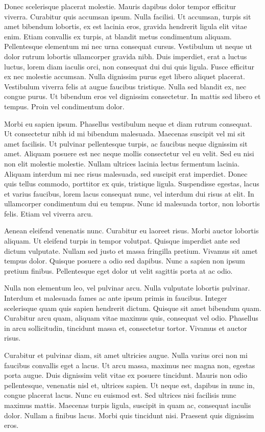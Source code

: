\documentclass[12pt,a4paper]{article}
\begin{document}
Donec scelerisque placerat molestie. Mauris dapibus dolor tempor efficitur viverra. Curabitur quis accumsan ipsum. Nulla facilisi. Ut accumsan, turpis sit amet bibendum lobortis, ex est lacinia eros, gravida hendrerit ligula elit vitae enim. Etiam convallis ex turpis, at blandit metus condimentum aliquam. Pellentesque elementum mi nec urna consequat cursus. Vestibulum ut neque ut dolor rutrum lobortis ullamcorper gravida nibh. Duis imperdiet, erat a luctus luctus, lorem diam iaculis orci, non consequat dui dui quis ligula. Fusce efficitur ex nec molestie accumsan. Nulla dignissim purus eget libero aliquet placerat. Vestibulum viverra felis at augue faucibus tristique. Nulla sed blandit ex, nec congue purus. Ut bibendum eros vel dignissim consectetur. In mattis sed libero et tempus. Proin vel condimentum dolor.

Morbi eu sapien ipsum. Phasellus vestibulum neque et diam rutrum consequat. Ut consectetur nibh id mi bibendum malesuada. Maecenas suscipit vel mi sit amet facilisis. Ut pulvinar pellentesque turpis, ac faucibus neque dignissim sit amet. Aliquam posuere est nec neque mollis consectetur vel eu velit. Sed eu nisi non elit molestie molestie. Nullam ultrices lacinia lectus fermentum lacinia. Aliquam interdum mi nec risus malesuada, sed suscipit erat imperdiet. Donec quis tellus commodo, porttitor ex quis, tristique ligula. Suspendisse egestas, lacus et varius faucibus, lorem lacus consequat nunc, vel interdum dui risus at elit. In ullamcorper condimentum dui eu tempus. Nunc id malesuada tortor, non lobortis felis. Etiam vel viverra arcu.

Aenean eleifend venenatis nunc. Curabitur eu laoreet risus. Morbi auctor lobortis aliquam. Ut eleifend turpis in tempor volutpat. Quisque imperdiet ante sed dictum vulputate. Nullam sed justo et massa fringilla pretium. Vivamus sit amet tempus dolor. Quisque posuere a odio sed dapibus. Nunc a sapien non ipsum pretium finibus. Pellentesque eget dolor ut velit sagittis porta at ac odio.

Nulla non elementum leo, vel pulvinar arcu. Nulla vulputate lobortis pulvinar. Interdum et malesuada fames ac ante ipsum primis in faucibus. Integer scelerisque quam quis sapien hendrerit dictum. Quisque sit amet bibendum quam. Curabitur arcu quam, aliquam vitae maximus quis, consequat vel odio. Phasellus in arcu sollicitudin, tincidunt massa et, consectetur tortor. Vivamus et auctor risus.

Curabitur et pulvinar diam, sit amet ultricies augue. Nulla varius orci non mi faucibus convallis eget a lacus. Ut arcu massa, maximus nec magna non, egestas porta augue. Duis dignissim velit vitae ex posuere tincidunt. Mauris non odio pellentesque, venenatis nisl et, ultrices sapien. Ut neque est, dapibus in nunc in, congue placerat lacus. Nunc eu euismod est. Sed ultrices nisi facilisis nunc maximus mattis. Maecenas turpis ligula, suscipit in quam ac, consequat iaculis dolor. Nullam a finibus lacus. Morbi quis tincidunt nisi. Praesent quis dignissim eros.
\end{document}
